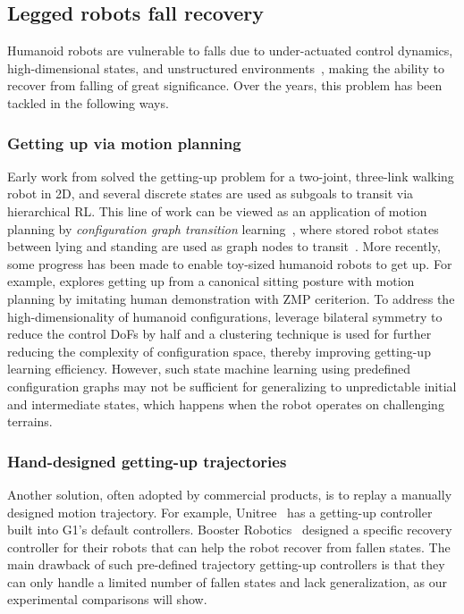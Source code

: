 \subsection{Legged robots fall recovery}
Humanoid robots are vulnerable to falls due to under-actuated control dynamics, high-dimensional states, and unstructured environments~\cite{WABOT1_73,HondaHumanoid98,MABEL09,krotkov2018darpa,Humanoid35DoF96,gu2025humanoid}, making the ability to recover from falling of great significance. 
Over the years, this problem has been tackled in the following ways.

\subsubsection{Getting up via motion planning}
Early work from \citet{Learning2StandUp98} solved the getting-up problem for a two-joint, three-link walking robot in 2D, and several discrete states are used as subgoals to transit via hierarchical RL. 
This line of work can be viewed as an application of motion planning by \textit{configuration graph transition} learning~\cite{StateTransitionGraph96}, where stored robot states between lying and standing are used as graph nodes to transit~\cite{UKEMI02,FirstHumanoidGetUp03,GettingUpMotionPlanning07,HumanoidBalancing16}.
More recently, some progress has been made to enable toy-sized humanoid robots to get up.
For example, \citet{HumanoidStandingUpLfDMultimodalReward13} explores getting up from a canonical sitting posture with motion planning by imitating human demonstration with ZMP ceriterion.
To address the high-dimensionality of humanoid configurations, \citet{StandUpSymmetry16} leverage bilateral symmetry to reduce the control DoFs by half and a clustering technique is used for further reducing the complexity of configuration space, thereby improving getting-up learning efficiency.
However, such state machine learning using predefined configuration graphs may not be sufficient for generalizing to unpredictable initial and intermediate states, which happens when the robot operates on challenging terrains.

\subsubsection{Hand-designed getting-up trajectories} 
Another solution, often adopted by commercial products, is to replay a manually designed motion trajectory. For example, Unitree~\cite{UnitreeG124} has a getting-up controller built into G1's default controllers. Booster Robotics~\cite{Booster} designed a specific recovery controller for their robots that can help the robot recover from fallen states. The main drawback of such pre-defined trajectory getting-up controllers is that they can only handle a limited number of fallen states and lack generalization, as our experimental comparisons will show.

